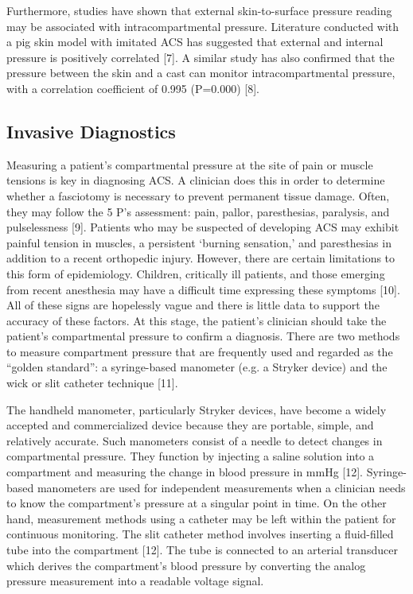 \documentclass{article}
\begin{document}
Furthermore, studies have shown that external skin-to-surface pressure reading may be associated with intracompartmental pressure. Literature conducted with a pig skin model with imitated ACS has suggested that external and internal pressure is positively correlated [7]. A similar study has also confirmed that the pressure between the skin and a cast can monitor intracompartmental pressure, with a correlation coefficient of 0.995 (P=0.000) [8].

\subsection{Invasive Diagnostics}
Measuring a patient’s compartmental pressure at the site of pain or muscle tensions is key in diagnosing ACS. A clinician does this in order to determine whether a fasciotomy is necessary to prevent permanent tissue damage. Often, they may follow the 5 P's assessment:  pain, pallor, paresthesias, paralysis, and pulselessness [9]. Patients who may be suspected of developing ACS may exhibit painful tension in muscles, a persistent ‘burning sensation,’ and paresthesias in addition to a recent orthopedic injury. However, there are certain limitations to this form of epidemiology. Children, critically ill patients, and those emerging from recent anesthesia may have a difficult time expressing these symptoms [10]. All of these signs are hopelessly vague and there is little data to support the accuracy of these factors. At this stage, the patient’s clinician should take the patient’s compartmental pressure to confirm a diagnosis. There are two methods to measure compartment pressure that are frequently used and regarded as the “golden standard”: a syringe-based manometer (e.g. a Stryker device) and the wick or slit catheter technique [11]. 

The handheld manometer, particularly Stryker devices, have become a widely accepted and commercialized device because they are portable, simple, and relatively accurate. Such manometers consist of a needle to detect changes in compartmental pressure. They function by injecting a saline solution into a compartment and measuring the change in blood pressure in mmHg [12]. Syringe-based manometers are used for independent measurements when a clinician needs to know the compartment’s pressure at a singular point in time. On the other hand, measurement methods using a catheter may be left within the patient for continuous monitoring. The slit catheter method involves inserting a fluid-filled tube into the compartment [12]. The tube is connected to an arterial transducer which derives the compartment’s blood pressure by converting the analog pressure measurement into a readable voltage signal. 
\end{document}
